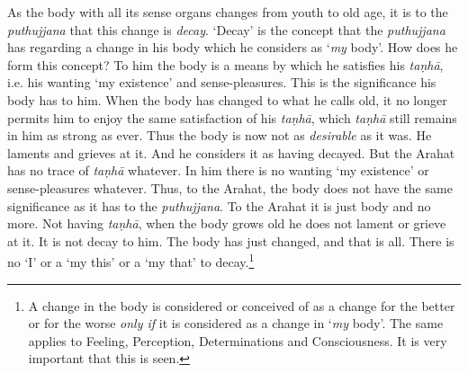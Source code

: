 As the body with all its sense organs changes from youth to old age, it is to the \textit{puthujjana} that this change is \emph{decay}. `Decay' is the concept that the \textit{puthujjana} has regarding a change in his body which he considers as `\emph{my} body'. How does he form this concept? To him the body is a means by which he satisfies his \textit{taṇhā}, i.e. his wanting `my existence' and sense-pleasures. This is the significance his body has to him. When the body has changed to what he calls old, it no longer permits him to enjoy the same satisfaction of his \textit{taṇhā}, which \textit{taṇhā} still remains in him as strong as ever. Thus the body is now not as \emph{desirable} as it was. He laments and grieves at it. And he considers it as having decayed. But the Arahat has no trace of \textit{taṇhā} whatever. In him there is no wanting `my existence' or sense-pleasures whatever. Thus, to the Arahat, the body does not have the same significance as it has to the \textit{puthujjana}. To the Arahat it is just body and no more. Not having \textit{taṇhā}, when the body grows old he does not lament or grieve at it. It is not decay to him. The body has just changed, and that is all. There is no `I' or a `my this' or a `my that' to decay.\footnote{A change in the body is considered or conceived of as a change for the better or for the worse \emph{only if} it is considered as a change in `\emph{my} body'. The same applies to Feeling, Perception, Determinations and Consciousness. It is very important that this is seen.}

